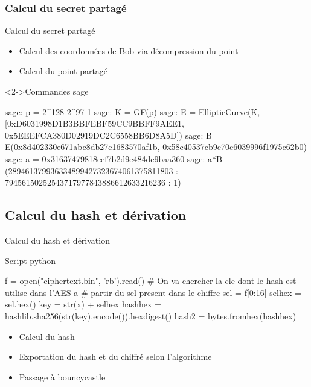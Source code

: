 \documentclass[10pt,sans,usenames,dvipsnames,french,compress]{beamer}
\begin{document}
\subsubsection{Calcul du secret partagé}
\begin{frame}[fragile]{Calcul du secret partagé}
  \begin{itemize}{}
    \item Calcul des coordonnées de Bob via décompression du point
    \item <2->Calcul du point partagé
  \end{itemize}
  \begin{block}<2->{Commandes sage}
    \begin{python}
  sage: p = 2^128-2^97-1
  sage: K = GF(p)
  sage: E = EllipticCurve(K,
  [0xD6031998D1B3BBFEBF59CC9BBFF9AEE1,
  0x5EEEFCA380D02919DC2C6558BB6D8A5D])
  sage: B = E(0x8d402330e671abc8db27e1683570af1b,
  0x58c40537cb9c70c6039996f1975c62b0)
  sage: a = 0x31637479818eef7b2d9e484dc9baa360
  sage: a*B
  (289461379936334899427323674061375811803 :
   79456150252543717977843886612633216236 : 1)
    \end{python}
    \vspace{-2mm}
  \end{block}
\end{frame}

\subsection{Calcul du hash et dérivation}
\begin{frame}[fragile]{Calcul du hash et dérivation}
  \begin{block}{Script python}
    \begin{python}
  f = open("ciphertext.bin", 'rb').read()
  # On va chercher la cle dont le hash est utilise dans l'AES a
  # partir du sel present dans le chiffre
  sel = f[0:16]
  selhex = sel.hex()
  key = str(x) + selhex
  hashhex = hashlib.sha256(str(key).encode()).hexdigest()
  hash2 = bytes.fromhex(hashhex)
    \end{python}
    \vspace{-2mm}
  \end{block}
  \begin{block}{}
    \begin{itemize}
      \item Calcul du hash
      \item <2-> Exportation du hash et du chiffré selon l'algorithme
      \item <3-> Passage à bouncycastle
    \end{itemize}

  \end{block}

\end{frame}
\end{document}
